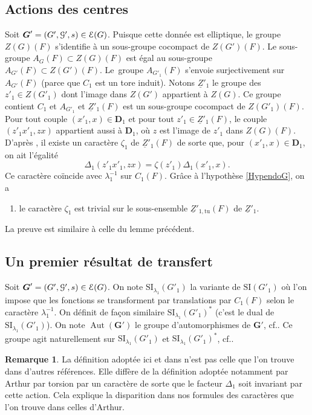 \documentclass[11pt]{article}
\newcommand{\cf}{cf.\xspace}
\numberwithin{equation}{section}\providecommand{\og}{«\,}\providecommand{\fg}{\,»}
\let\mathcal \EuScript
\newcommand{\SI}{\mathrm{SI}}
\newcommand{\tu}{\mathrm{tu}}
\DeclareMathOperator{\Aut}{Aut}
\newcommand{\bD}{\boldsymbol{D}}
\newcommand{\bG}{\boldsymbol{G}}
\newcommand{\cE}{\mathcal{E}}
\newcommand{\cG}{\mathcal{G}}
\theoremstyle{plain}
\theoremstyle{definition}
\newtheorem*{rem*}{Remarque}
\begin{document}
\subsection{Actions des centres}\label{actiondescentres}
Soit $\bG'=(G',\cG',s)\in \cE(G)$. Puisque cette donnée est elliptique, le groupe $Z(G)(F)$ s'identifie à un sous-groupe cocompact de $Z(G')(F)$. Le sous-groupe $A_{G}(F)\subset Z(G)(F)$ est égal au sous-groupe $A_{G'}(F)\subset Z(G')(F)$. Le~groupe $A_{G'_{1}}(F)$ s'envoie surjectivement sur $A_{G'}(F)$ (parce que $C_{1}$ est un tore induit). Notons $\underline{Z}'_{1}$ le groupe des $z'_{1}\in Z(G'_{1})$ dont l'image dans $Z(G')$ appartient à $Z(G)$. Ce groupe contient $C_{1}$ et $A_{G'_{1}}$ et $ \underline{Z}'_{1}(F)$ est un sous-groupe cocompact de $Z(G'_{1})(F)$. Pour tout couple $(x'_{1},x)\in \bD_{1}$ et pour tout $z'_{1}\in \underline{Z}'_{1}(F)$, le couple $(z'_{1}x'_{1},zx)$ appartient aussi à $\bD_{1}$, où $z$ est l'image de $z'_{1}$ dans $Z(G)(F)$. D'après \cite[Lem.\,4.4.A]{LS}, il existe un caractère $\zeta_{1}$ de $\underline{Z}'_{1}(F)$ de sorte que, pour $(x'_{1},x)\in \bD_{1}$, on ait l'égalité
\[
\Delta_{1}(z'_{1}x'_{1},zx)=\zeta(z'_{1})\Delta_{1}(x'_{1},x).
\]
Ce caractère coïncide avec $\lambda_{1}^{-1}$ sur $C_{1}(F)$.
Grâce à l'hypothèse \ref{HypendoG}, on a
\begin{enumerate}
\item\label{actiondescentres1}
le caractère $\zeta_{1}$ est trivial sur le sous-ensemble $\underline{Z}'_{1,\tu}(F)$ de $\underline{Z}'_{1}$.
\end{enumerate}

La preuve est similaire à celle du lemme précédent.

\subsection{Un premier résultat de transfert}\label{unpremierresultat}
Soit $\bG'=(G',\cG',s)\in \cE(G)$. On note $\SI_{\lambda_{1}}(G'_{1})$ la variante de $\SI(G'_{1})$ où l'on impose que les fonctions se transforment par translations par $C_{1}(F)$ selon le caractère $\lambda_{1}^{-1}$. On définit de façon similaire $\SI_{\lambda_{1}}(G'_{1})^*$ (c'est le dual de $\SI_{\lambda_{1}}(G'_{1})$). On note $\Aut(\bG')$ le groupe d'automorphismes de $\bG'$, \cf \cite[I.1.5]{MW}. Ce groupe agit naturellement sur $\SI_{\lambda_{1}}(G'_{1})$ et $\SI_{\lambda_{1}}(G'_{1})^*$, \cf \cite[I.2.6]{MW}.

\begin{rem*}
La définition adoptée ici et dans \cite{MW} n'est pas celle que l'on trouve dans d'autres références. Elle diffère de la définition adoptée notamment par Arthur par torsion par un caractère de sorte que le facteur $\Delta_{1}$ soit invariant par cette action. Cela explique la disparition dans nos formules des caractères que l'on trouve dans celles d'Arthur.
\end{rem*}
\end{document}
